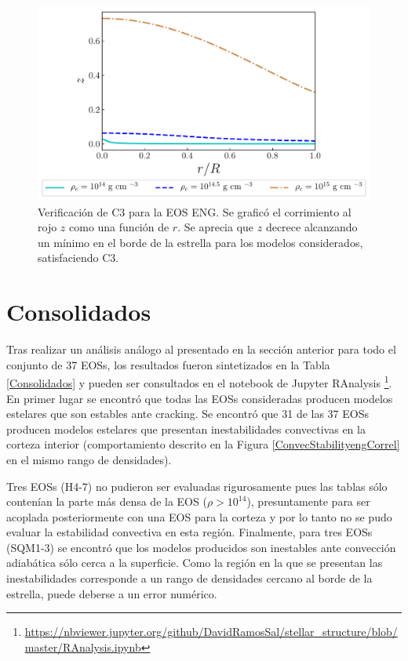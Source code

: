 \begin{figure}[H]
    \centering
    \includegraphics[width=0.93\linewidth]{figures/Redshifteng.pdf}
    \caption[Verificación de C3 para la EOS ENG]{Verificación de C3 para la EOS ENG. Se graficó el corrimiento al rojo $z$ como una función de $r$. Se aprecia que $z$ decrece alcanzando un mínimo en el borde de la estrella para los modelos considerados, satisfaciendo C3.}
    \label{Redshifteng}
\end{figure}

\section{Consolidados}

\noindent Tras realizar un análisis análogo al presentado en la sección anterior para todo el conjunto de 37 EOSs, los resultados fueron sintetizados en la Tabla \ref{Consolidados} y pueden ser consultados en el notebook de Jupyter RAnalysis \footnote{\url{https://nbviewer.jupyter.org/github/DavidRamosSal/stellar_structure/blob/master/RAnalysis.ipynb}}. En primer lugar se encontró que todas las EOSs consideradas producen modelos estelares que son estables ante cracking. Se encontró que 31 de las 37 EOSs producen modelos estelares que presentan inestabilidades convectivas en la corteza interior (comportamiento descrito en la Figura \ref{ConvecStabilityengCorrel} en el mismo rango de densidades).

Tres EOSs (H4-7) no pudieron ser evaluadas rigurosamente pues las tablas sólo contenían la parte más densa de la EOS ($\rho > 10^{14}$), presuntamente para ser acoplada posteriormente con una EOS para la corteza y por lo tanto no se pudo evaluar la estabilidad convectiva en esta región. Finalmente, para tres EOSs (SQM1-3) se encontró que los modelos producidos son inestables ante convección adiabática sólo cerca a la superficie. Como la región en la que se presentan las inestabilidades corresponde a un rango de densidades cercano al borde de la estrella, puede deberse a un error numérico.

